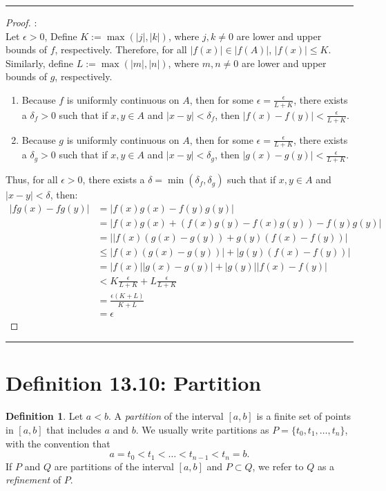 \documentclass[openany, amssymb, psamsfonts]{amsart}
\theoremstyle{definition}
\newtheorem{defn}{Definition}[section]
\numberwithin{equation}{section}
\begin{document}
\vspace{4pt}     \hrule   \vspace{4pt} \begin{proof}:\\
Let $\epsilon>0$, Define $K := \max(|j|,|k|)$, where $j,k\neq 0$ are lower and upper bounds of $f$, respectively. Therefore, for all $|f(x)|\in |f(A)|$, $|f(x)|\leq K$. Similarly, define $L := \max(|m|,|n|)$, where $m,n\neq 0$ are lower and upper bounds of $g$, respectively.
\begin{enumerate}
    \item Because $f$ is uniformly continuous on $A$, then for some $\epsilon = \frac{\epsilon}{L+K}$, there exists a $\delta_f >0$ such that if $x,y\in A$ and $|x-y|<\delta_f$, then $|f(x) - f(y)|<\frac{\epsilon}{L+K}$.
    \item Because $g$ is uniformly continuous on $A$, then for some $\epsilon = \frac{\epsilon}{L+K}$, there exists a $\delta_g>0$ such that if $x,y\in A$ and $|x-y|<\delta_g$, then $|g(x) - g(y)|<\frac{\epsilon}{L+K}$.
\end{enumerate}
Thus, for all $\epsilon>0$, there exists a $\delta = \min(\delta_f, \delta_g)$ such that if $x,y \in A$ and $|x-y|<\delta$, then:
\begin{align*}
    |fg(x) - fg(y)| &= |f(x)g(x) - f(y)g(y)|\\
                    &= |f(x)g(x) + (f(x)g(y) - f(x)g(y)) - f(y)g(y)|\\
                    &= ||f(x)(g(x) - g(y)) + g(y)(f(x) - f(y))|\\
                    &\leq |f(x)(g(x) - g(y))| + |g(y)(f(x) - f(y))|\\
                    &= |f(x)||g(x) - g(y)| + |g(y)||f(x) - f(y)|\\
                    &<K \frac{\epsilon}{L+K} + L \frac{\epsilon}{L+K}\\
                    &= \frac{\epsilon(K+L)}{K+L}\\
                    &= \epsilon
\end{align*}  
\end{proof} \vspace{4pt}     \hrule   \vspace{4pt}

\section*{Definition 13.10: Partition}
\begin{defn}
\label{13.10}
	Let $a<b.$ A \emph{partition} of the interval $[a, b]$ is a finite set of points in $[a, b]$ that includes $a$ and $b$. We usually write partitions as $P = \{t_0, t_1, \dots, t_n\}$, with the convention that
	\[
		a = t_0 < t_1 < \dots < t_{n - 1} < t_n = b.
	\]
	If $P$ and $Q$ are partitions of the interval $[a, b]$ and $P \subset Q$, we refer to $Q$ as a \emph{refinement} of $P$.
\end{defn}
\end{document}
